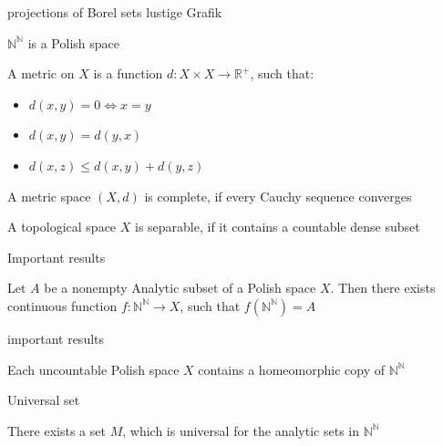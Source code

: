 \documentclass{beamer}
\numberwithin{equation}{section}
\begin{document}
\begin{frame}{projections of Borel sets}
	lustige Grafik
\end{frame}


\begin{frame}{$\mathbb{N}^\mathbb{N}$ is a Polish space}
\begin{definition}[metric]
	A metric on $X$ is a function  $d: X \times X \to \mathbb{R}^+$, such that:
\begin{itemize}
	\item $d\left( x,y \right) = 0 \iff x = y$
	\item $d\left( x,y \right) = d\left( y,x \right) $
	\item $d\left( x,z \right) \leq d\left( x,y \right) + d\left( y,z \right) $ 
\end{itemize}
\end{definition}

\begin{definition}[complete]
	A metric space $\left( X,d \right) $ is complete, if every Cauchy sequence converges
\end{definition}

\begin{definition}[separable]
	A topological space $X$ is separable, if it contains a countable dense subset
\end{definition}

\end{frame}

\begin{frame}{Important results}
	\begin{theorem}
		Let $A$ be a nonempty Analytic subset of a Polish space $X$. Then there exists continuous function $f: \mathbb{N}^{\mathbb{N}} \to X$, such that $f\left( \mathbb{N}^{\mathbb{N}} \right) = A$
	\end{theorem}
\end{frame}


\begin{frame}{important results}
\begin{theorem}
	Each uncountable Polish space $X$ contains a homeomorphic copy of  $\mathbb{N}^\mathbb{N}$
\end{theorem}
\end{frame}


\begin{frame}{Universal set}
	\begin{theorem}
		There exists a set $M$, which is universal for the analytic sets in  $\mathbb{N}^\mathbb{N}$
	\end{theorem}
\end{frame}
\end{document}
